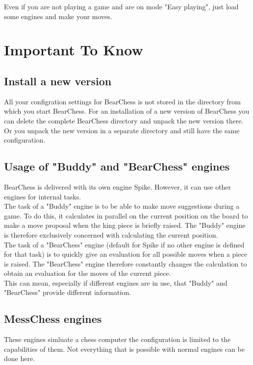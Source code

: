 \documentclass[11pt,a4paper]{article}
\begin{document}
Even if you are not playing a game and are on mode "Easy playing", just load some engines and make your moves.

\section{Important To Know}

\subsection{Install a new version}
All your configration settings for BearChess is not stored in the directory from which you start BearChess. For an installation of a new version of BearChess you can delete the complete BearChess directory and unpack the new version there. Or you unpack the new version in a separate directory and still have the same configuration.

\subsection{Usage of "Buddy" and "BearChess" engines} \label{BuddyBearChessEngines}
BearChess is delivered with its own engine Spike. However, it can use other engines for internal tasks.\\
The task of a "Buddy" engine is to be able to make move suggestions during a game. To do this, it calculates in parallel on the current position on the board to make a move proposal when the king piece is briefly raised. The "Buddy" engine is therefore exclusively concerned with calculating the current position.\\
The task of a "BearChess" engine (default for Spike if no other engine is defined for that task) is to quickly give an evaluation for all possible moves when a piece is raised. The "BearChess" engine therefore constantly changes the calculation to obtain an evaluation for the moves of the current piece.\\
This can mean, especially if different engines are in use, that "Buddy" and "BearChess" provide different information. 

\subsection{MessChess engines}
These engines simluate a chess computer the configuration is limited to the capabilities of them. Not everything that is possible with normal engines can be done here. 
\end{document}
